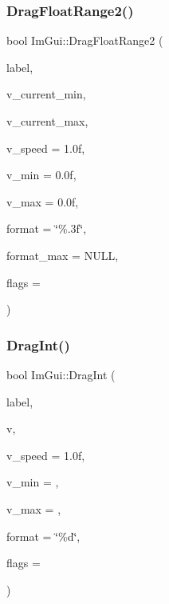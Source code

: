 \mbox{\label{namespaceImGui_aa6bfd93ead5c47e84b66185da88b8e8c}} 
\subsubsection{\texorpdfstring{Drag\+Float\+Range2()}{DragFloatRange2()}}
{\footnotesize\ttfamily bool Im\+Gui\+::\+Drag\+Float\+Range2 (\begin{DoxyParamCaption}\item[{const char $\ast$}]{label,  }\item[{float $\ast$}]{v\+\_\+current\+\_\+min,  }\item[{float $\ast$}]{v\+\_\+current\+\_\+max,  }\item[{float}]{v\+\_\+speed = {\ttfamily 1.0f},  }\item[{float}]{v\+\_\+min = {\ttfamily 0.0f},  }\item[{float}]{v\+\_\+max = {\ttfamily 0.0f},  }\item[{const char $\ast$}]{format = {\ttfamily \char`\"{}\%.3f\char`\"{}},  }\item[{const char $\ast$}]{format\+\_\+max = {\ttfamily NULL},  }\item[{Im\+Gui\+Slider\+Flags}]{flags = {} }\end{DoxyParamCaption})}

\mbox{\label{namespaceImGui_a3714db739ae51fc75601d7fad234a58b}} 
\subsubsection{\texorpdfstring{Drag\+Int()}{DragInt()}}
{\footnotesize\ttfamily bool Im\+Gui\+::\+Drag\+Int (\begin{DoxyParamCaption}\item[{const char $\ast$}]{label,  }\item[{int $\ast$}]{v,  }\item[{float}]{v\+\_\+speed = {\ttfamily 1.0f},  }\item[{int}]{v\+\_\+min = {},  }\item[{int}]{v\+\_\+max = {},  }\item[{const char $\ast$}]{format = {\ttfamily \char`\"{}\%d\char`\"{}},  }\item[{Im\+Gui\+Slider\+Flags}]{flags = {} }\end{DoxyParamCaption})}

